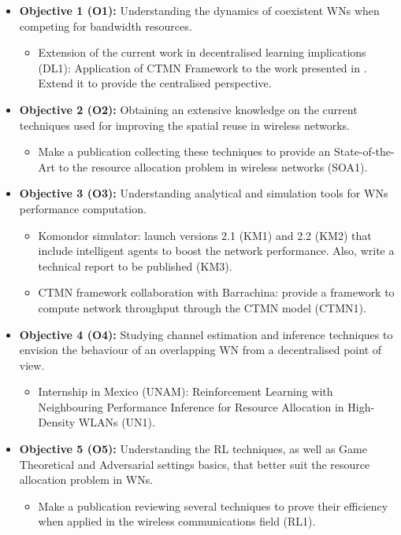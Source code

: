 \documentclass[12pt, a4paper,twoside]{tesi_upf}
\begin{document}
		\begin{itemize}
			\item \textbf{Objective 1 (O1):} Understanding the dynamics of coexistent WNs when competing for bandwidth resources.
			\begin{itemize}
				\item Extension of the current work in decentralised learning implications (DL1): Application of CTMN Framework to the work presented in \cite{wilhelmi2017implications}. Extend it to provide the centralised perspective.
			\end{itemize}
			\item \textbf{Objective 2 (O2):} Obtaining an extensive knowledge on the current techniques used for improving the spatial reuse in wireless networks.
			\begin{itemize}
				\item Make a publication collecting these techniques to provide an State-of-the-Art to the resource allocation problem in wireless networks (SOA1).
			\end{itemize}
			\item \textbf{Objective 3 (O3):} Understanding analytical and simulation tools for WNs performance computation.
			\begin{itemize}
				\item Komondor simulator: launch versions 2.1 (KM1) and 2.2 (KM2) that include intelligent agents to boost the network performance. Also, write a technical report to be published (KM3).
				\item CTMN framework collaboration with Barrachina: provide a framework to compute network throughput through the CTMN model (CTMN1).
			\end{itemize}
			\item \textbf{Objective 4 (O4):} Studying channel estimation and inference techniques to envision the behaviour of an overlapping WN from a decentralised point of view.
			\begin{itemize}
				\item Internship in Mexico (UNAM): Reinforcement Learning with Neighbouring Performance Inference for Resource Allocation in High-Density WLANs (UN1).
			\end{itemize}		
			\item \textbf{Objective 5 (O5):} Understanding the RL techniques, as well as Game Theoretical and Adversarial settings basics, that better suit the resource allocation problem in WNs. 
			\begin{itemize}
				\item Make a publication reviewing several techniques to prove their efficiency when applied in the wireless communications field (RL1).

\end{itemize}
\end{itemize}
\end{document}
